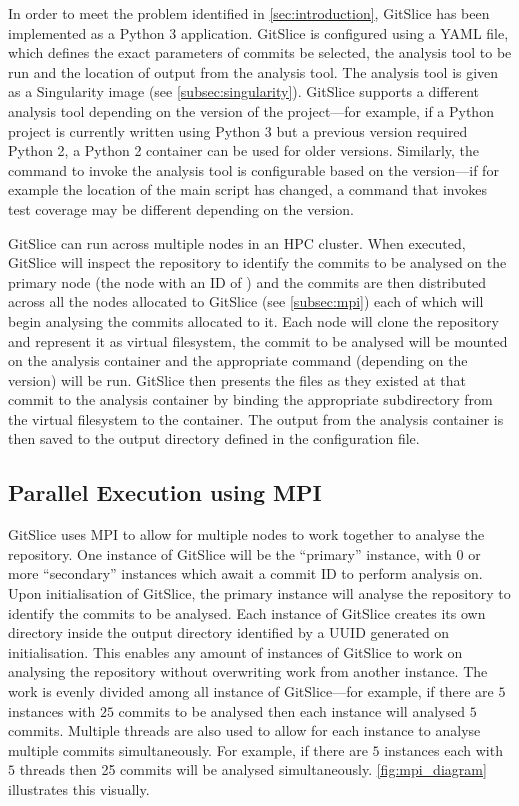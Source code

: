 In order to meet the problem identified in \autoref{sec:introduction}, GitSlice has been implemented as a Python 3 application.
GitSlice is configured using a YAML file, which defines the exact parameters of commits be selected, the analysis tool to be run and the location of output from the analysis tool.
The analysis tool is given as a Singularity image (see \autoref{subsec:singularity}).
GitSlice supports a different analysis tool depending on the version of the project---for example, if a Python project is currently written using Python 3 but a previous version required Python 2, a Python 2 container can be used for older versions.
Similarly, the command to invoke the analysis tool is configurable based on the version---if for example the location of the main script has changed, a command that invokes test coverage may be different depending on the version.

GitSlice can run across multiple nodes in an HPC cluster.
When executed, GitSlice will inspect the repository to identify the commits to be analysed on the primary node (the node with an ID of ) and the commits are then distributed across all the nodes allocated to GitSlice (see \autoref{subsec:mpi}) each of which will begin analysing the commits allocated to it.
Each node will clone the repository and represent it as virtual filesystem, the commit to be analysed will be mounted on the analysis container and the appropriate command (depending on the version) will be run.
GitSlice then presents the files as they existed at that commit to the analysis container by binding the appropriate subdirectory from the virtual filesystem to the container.
The output from the analysis container is then saved to the output directory defined in the configuration file.

\subsection{Parallel Execution using MPI}
\label{subsec:mpi}

GitSlice uses MPI to allow for multiple nodes to work together to analyse the repository.
One instance of GitSlice will be the ``primary'' instance, with $ 0 $ or more ``secondary'' instances which await a commit ID to perform analysis on.
Upon initialisation of GitSlice, the primary instance will analyse the repository to identify the commits to be analysed.
Each instance of GitSlice creates its own directory inside the output directory identified by a UUID generated on initialisation.
This enables any amount of instances of GitSlice to work on analysing the repository without overwriting work from another instance.
The work is evenly divided among all instance of GitSlice---for example, if there are $ 5 $ instances with $ 25 $ commits to be analysed then each instance will analysed $ 5 $ commits.
Multiple threads are also used to allow for each instance to analyse multiple commits simultaneously.
For example, if there are $ 5 $ instances each with $ 5 $ threads then 25 commits will be analysed simultaneously.
\autoref{fig:mpi_diagram} illustrates this visually.

